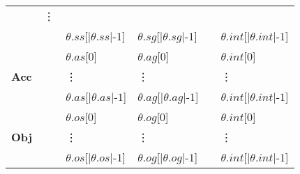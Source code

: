 \documentclass[11pt]{report}
\begin{document}
\begin{table}[tbhp]
\begin{center}
\begin{tabular}[t]{|l|l|l|l|l|l|}
              &
              \hspace{1em}\vdots \\
              &
              &
              $\theta$.$ss$[$|\theta$.$ss|$-$1$] &
              $\theta$.$sg$[$|\theta$.$sg|$-$1$] &
              &
              $\theta$.$int$[$|\theta$.$int|$-$1$] \\
              \cline{1-1}\cline{3-6}
              \multirow{3}{*}{
                \begin{sideways}
                  \textbf{Acc}
                \end{sideways}
              } &
              &
              $\theta$.$as$[$0$] &
              $\theta$.$ag$[$0$] &
              &
              $\theta$.$int$[$0$] \\
              &
              &
              \hspace{1em}\vdots &
              \hspace{1em}\vdots &
              &
              \hspace{1em}\vdots \\
              &
              &
              $\theta$.$as$[$|\theta$.$as|$-$1$] &
              $\theta$.$ag$[$|\theta$.$ag|$-$1$] &
              &
              $\theta$.$int$[$|\theta$.$int|$-$1$] \\
              \cline{1-1}\cline{3-6}
              \multirow{3}{*}{
                \begin{sideways}
                  \textbf{Obj}
                \end{sideways}
              } &
              &
              $\theta$.$os$[$0$] &
              $\theta$.$og$[$0$] &
              &
              $\theta$.$int$[$0$] \\
              &
              &
              \hspace{1em}\vdots &
              \hspace{1em}\vdots &
              &
              \hspace{1em}\vdots \\
              &
              &
              $\theta$.$os$[$|\theta$.$os|$-$1$] &
              $\theta$.$og$[$|\theta$.$og|$-$1$] &
              &
              $\theta$.$int$[$|\theta$.$int|$-$1$] \\
              \hline

\end{tabular}
\end{center}
\end{table}
\end{document}
